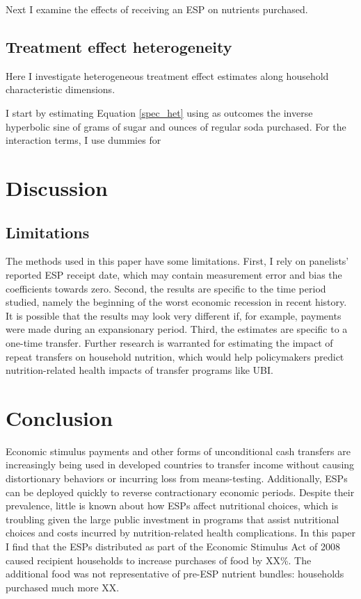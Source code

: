 \documentclass[12pt]{article}
\begin{document}
Next I examine the effects of receiving an ESP on nutrients purchased.


\subsection{Treatment effect heterogeneity}

Here I investigate heterogeneous treatment effect estimates along household characteristic dimensions.

I start by estimating Equation \ref{spec_het} using as outcomes the inverse hyperbolic sine of grams of sugar and ounces of regular soda purchased.
For the interaction terms, I use dummies for

\section{Discussion} \label{discussion}



\subsection{Limitations}

The methods used in this paper have some limitations.
First, I rely on panelists' reported ESP receipt date, which may contain measurement error and bias the coefficients towards zero.
Second, the results are specific to the time period studied, namely the beginning of the worst economic recession in recent history.
It is possible that the results may look very different if, for example, payments were made during an expansionary period.
Third, the estimates are specific to a one-time transfer.
Further research is warranted for estimating the impact of repeat transfers on household nutrition, which would help policymakers predict nutrition-related health impacts of transfer programs like UBI.


\section{Conclusion} \label{conclusion}

Economic stimulus payments and other forms of unconditional cash transfers are increasingly being used in developed countries to transfer income without causing distortionary behaviors or incurring loss from means-testing.
Additionally, ESPs can be deployed quickly to reverse contractionary economic periods.
Despite their prevalence, little is known about how ESPs affect nutritional choices, which is troubling given the large public investment in programs that assist nutritional choices and costs incurred by nutrition-related health complications.
In this paper I find that the ESPs distributed as part of the Economic Stimulus Act of 2008 caused recipient households to increase purchases of food by XX\%.
The additional food was not representative of pre-ESP nutrient bundles: households purchased much more XX.
\end{document}
